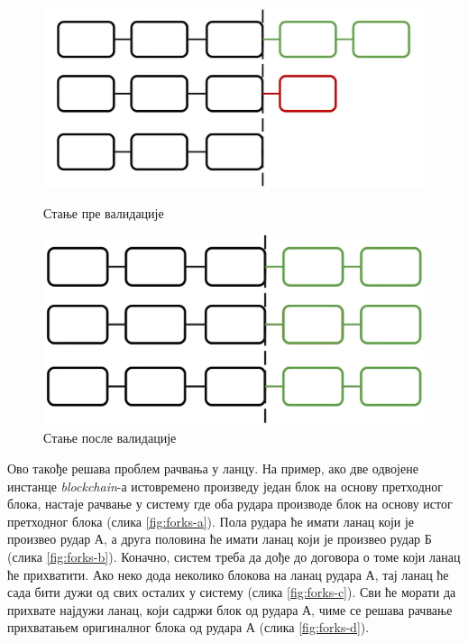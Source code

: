 \documentclass[12pt, a4paper]{article}
\begin{document}
\begin{figure}[h]
    \centering
    \begin{minipage}{0.45\linewidth}
        \centering
        \includegraphics[width=\linewidth]{slike/longer-chains-before.png}
        \caption{Стање пре валидације}
        \label{fig:validation-1}
    \end{minipage}
    \hfill
    \begin{minipage}{0.45\linewidth}
        \centering
        \includegraphics[width=\linewidth]{slike/longer-chains-after.png}
        \caption{Стање после валидације}
        \label{fig:validation-2}
    \end{minipage}
\end{figure}

\newpage
Ово такође решава проблем рачвања у ланцу. На пример, ако две одвојене инстанце \textit{blockchain}-а истовремено произведу један блок на основу претходног блока, настаје рачвање у систему где оба рудара производе блок на основу истог претходног блока (слика \ref{fig:forks-a}). Пола рудара ће имати ланац који је произвео рудар А, а друга половина ће имати ланац који је произвео рудар Б (слика \ref{fig:forks-b}). Коначно, систем треба да дође до договора о томе који ланац ће прихватити. Ако неко дода неколико блокова на ланац рудара А, тај ланац ће сада бити дужи од свих осталих у систему (слика \ref{fig:forks-c}). Сви ће морати да прихвате најдужи ланац, који садржи блок од рудара А, чиме се решава рачвање прихватањем оригиналног блока од рудара А (слика \ref{fig:forks-d}).
\end{document}
